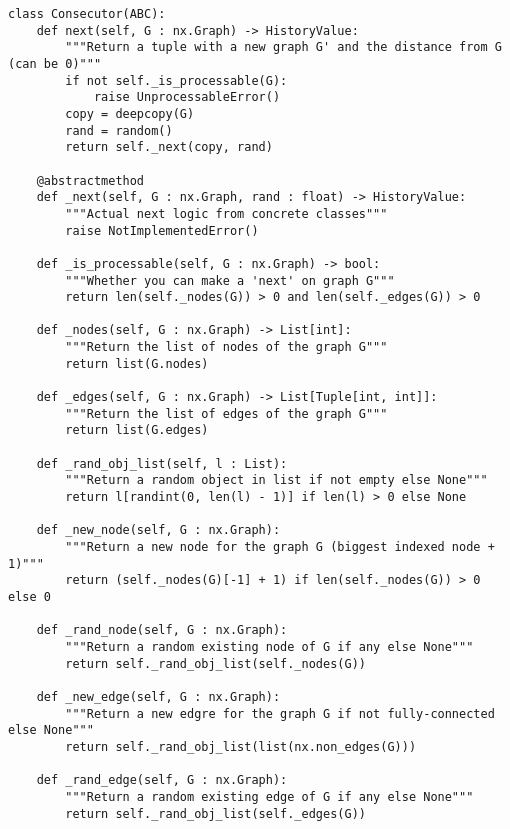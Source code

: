 \begin{lstlisting}[label={code:abstract_consecutor}, caption={Abstract Consecutor}]
class Consecutor(ABC):
	def next(self, G : nx.Graph) -> HistoryValue:
		"""Return a tuple with a new graph G' and the distance from G (can be 0)"""
		if not self._is_processable(G):
			raise UnprocessableError()
		copy = deepcopy(G)
		rand = random()
		return self._next(copy, rand)
	
	@abstractmethod
	def _next(self, G : nx.Graph, rand : float) -> HistoryValue:
		"""Actual next logic from concrete classes"""
		raise NotImplementedError()
	
	def _is_processable(self, G : nx.Graph) -> bool:
		"""Whether you can make a 'next' on graph G"""
		return len(self._nodes(G)) > 0 and len(self._edges(G)) > 0
	
	def _nodes(self, G : nx.Graph) -> List[int]:
		"""Return the list of nodes of the graph G"""
		return list(G.nodes)
	
	def _edges(self, G : nx.Graph) -> List[Tuple[int, int]]:
		"""Return the list of edges of the graph G"""
		return list(G.edges)
	
	def _rand_obj_list(self, l : List):
		"""Return a random object in list if not empty else None"""
		return l[randint(0, len(l) - 1)] if len(l) > 0 else None
	
	def _new_node(self, G : nx.Graph):
		"""Return a new node for the graph G (biggest indexed node + 1)"""
		return (self._nodes(G)[-1] + 1) if len(self._nodes(G)) > 0 else 0
	
	def _rand_node(self, G : nx.Graph):
		"""Return a random existing node of G if any else None"""
		return self._rand_obj_list(self._nodes(G))
	
	def _new_edge(self, G : nx.Graph):
		"""Return a new edgre for the graph G if not fully-connected else None"""
		return self._rand_obj_list(list(nx.non_edges(G)))
	
	def _rand_edge(self, G : nx.Graph):
		"""Return a random existing edge of G if any else None"""
		return self._rand_obj_list(self._edges(G))
\end{lstlisting}